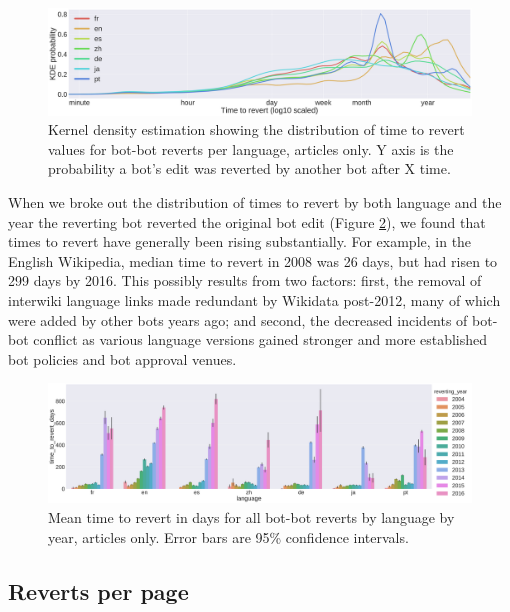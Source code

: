 \documentclass[format=acmsmall, review=false, screen=true]{acmart}%
\begin{document}
\begin{figure}[H]
\includegraphics[width=\textwidth]{figures/time-to-revert-log-articles.pdf}
\caption{Kernel density estimation showing the distribution of time to revert values for bot-bot reverts per language, articles only. Y axis is the probability a bot's edit was reverted by another bot after X time.}
\label{fig:ttr-articles}
\end{figure}
When we broke out the distribution of times to revert by both language and the year the reverting bot reverted the original bot edit (Figure \ref{fig:mean-days-to-revert}), we found that times to revert have generally been rising substantially. For example, in the English Wikipedia, median time to revert in 2008 was 26 days, but had risen to 299 days by 2016. This possibly results from two factors: first, the removal of interwiki language links made redundant by Wikidata post-2012, many of which were added by other bots years ago; and second, the decreased incidents of bot-bot conflict as various language versions gained stronger and more established bot policies and bot approval venues.  

\begin{figure}[H]
\includegraphics[width=\textwidth]{figures/mean-days-to-revert-articles.pdf}
\caption{Mean time to revert in days for all bot-bot reverts by language by year, articles only. Error bars are 95\% confidence intervals.}
\label{fig:mean-days-to-revert}
\end{figure}

\subsection{Reverts per page} \label{s:exploratory:rpp}
\end{document}
